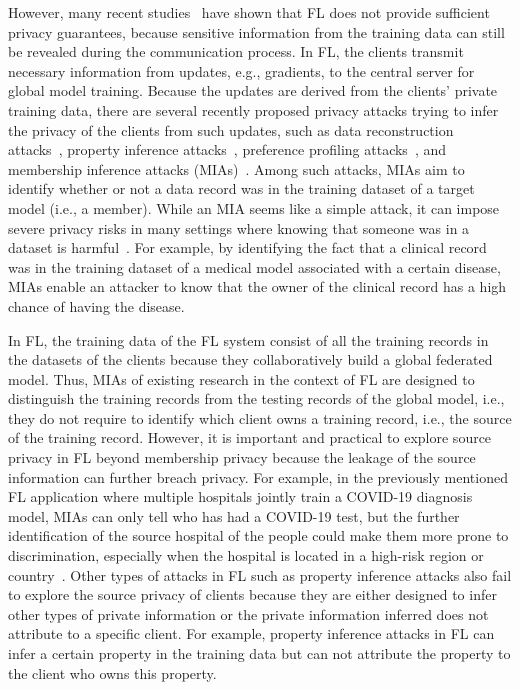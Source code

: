 \documentclass[10pt,journal,compsoc]{IEEEtran}
\begin{document}
However, many recent studies~\cite{melis2019exploiting,nasr2019comprehensive,zhu2019deep,wang2019beyond,truex2019hybrid,zhou2022ppa} have shown that FL does not provide sufficient privacy
guarantees, because sensitive information from the training data can still be revealed during the communication process. In FL, the clients transmit necessary information from updates, {e.g.}, gradients, to the central server for global model training. Because the updates are derived from the clients' private training data, there are several recently proposed privacy attacks trying to infer the privacy of the clients from such updates, such as data reconstruction attacks~\cite{hitaj2017deep}, property inference attacks~\cite{ganju2018property}, preference profiling attacks~\cite{zhou2022ppa}, and membership inference attacks (MIAs)~\cite{shokri2017membership}. Among such attacks, MIAs aim to identify whether or not a data record was in the training dataset of a target model ({i.e.,} a member). While an MIA seems like a simple attack, it can impose severe privacy risks in many settings where knowing that someone was in a dataset is harmful~\cite{homer2008resolving}. For example, by identifying the fact that a clinical record was in the training dataset of a medical model associated with a certain disease, MIAs enable an attacker to know that the owner of the clinical record has a high chance of having the disease.

{In FL, the training data of the FL system consist of all the training records in the datasets of the clients because they collaboratively build a global federated model. Thus, MIAs of existing research in the context of FL \cite{melis2019exploiting,nasr2019comprehensive,pustozerova2020information,hu2022membership} are designed to distinguish the training records from the testing records of the global model, i.e., they do not require to identify which client owns a training record, {i.e.,} the source of the training record. However, it is important and practical to explore source privacy in FL beyond membership privacy because the leakage of the source information can further breach privacy. For example, in the previously mentioned FL application where multiple hospitals jointly train a COVID-19 diagnosis model, MIAs can only tell who has had a COVID-19 test, but the further identification of the source hospital of the people could make them more prone to discrimination, especially when the hospital is located in a high-risk region or country~\cite{devakumar2020racism}. Other types of attacks in FL such as property inference attacks also fail to explore the source privacy of clients because they are either designed to infer other types of private information or the private information inferred does not attribute to a specific client. For example, property inference attacks in FL \cite{melis2019exploiting} can infer a certain property in the training data but can not attribute the property to the client who owns this property.}
\end{document}
